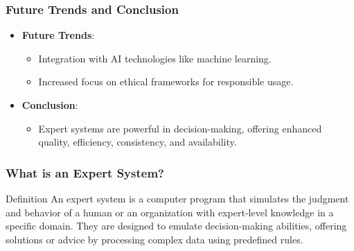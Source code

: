 \documentclass[aspectratio=169]{beamer}
\begin{document}
\begin{frame}[fragile]
    \frametitle{Future Trends and Conclusion}
    \begin{itemize}
        \item \textbf{Future Trends}:
            \begin{itemize}
                \item Integration with AI technologies like machine learning.
                \item Increased focus on ethical frameworks for responsible usage.
            \end{itemize}
        \item \textbf{Conclusion}:
            \begin{itemize}
                \item Expert systems are powerful in decision-making, offering enhanced quality, efficiency, consistency, and availability.
            \end{itemize}
    \end{itemize}
\end{frame}

\begin{frame}[fragile]
    \frametitle{What is an Expert System?}
    \begin{block}{Definition}
        An expert system is a computer program that simulates the judgment and behavior of a human or an organization with expert-level knowledge in a specific domain. They are designed to emulate decision-making abilities, offering solutions or advice by processing complex data using predefined rules.
    \end{block}
\end{frame}
\end{document}
